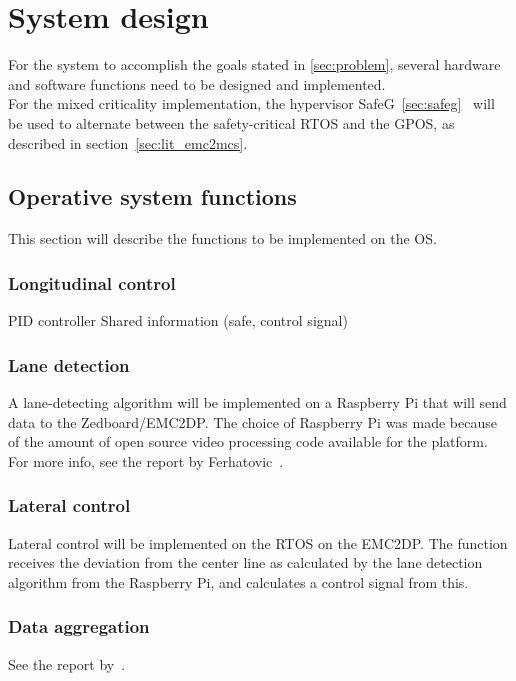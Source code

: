 \chapter{System design}
\label{sec:system_design}
For the system to accomplish the goals stated in \ref{sec:problem}, several hardware and software functions need to be designed and implemented.\\

For the mixed criticality implementation, the hypervisor SafeG~\ref{sec:safeg}~\cite{website:safeg} will be used to alternate between the safety-critical RTOS and the GPOS, as described in section~\ref{sec:lit_emc2mcs}.

\section{Operative system functions}
This section will describe the functions to be implemented on the OS.

\subsection{Longitudinal control}
PID controller
Shared information (safe, control signal)

\subsection{Lane detection}
A lane-detecting algorithm will be implemented on a Raspberry Pi that will send data to the Zedboard/EMC2DP. The choice of Raspberry Pi was made because of the amount of open source video processing code available for the platform. For more info, see the report by Ferhatovic~\cite{ferhatovic2017}.

\subsection{Lateral control}
Lateral control will be implemented on the RTOS on the EMC2DP. The function receives the deviation from the center line as calculated by the lane detection algorithm from the Raspberry Pi, and calculates a control signal from this.

\subsection{Data aggregation}
See the report by~\cite{hellman2017}.

